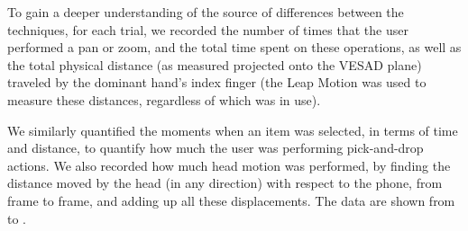 To gain a deeper understanding of the source of differences between
the techniques, for each trial, we recorded the number of times that the user performed a pan or zoom, and the total time spent on these operations,
as well as the total physical distance (as measured projected onto the VESAD plane) traveled by the dominant hand's index finger (the Leap Motion was used to measure these distances, regardless of which  was in use).

We similarly quantified the moments when an item was selected, in terms of time and distance, to quantify how much the user was performing pick-and-drop actions.
We also recorded how much head motion was performed, by finding the distance moved by the head (in any direction) with respect to the phone,
from frame to frame, and adding up all these displacements. The data are shown from  to .




